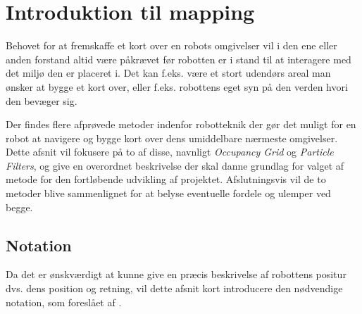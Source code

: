 \section{Introduktion til mapping}
Behovet for at fremskaffe et kort over en robots omgivelser vil i den ene eller anden forstand altid være påkrævet før robotten er i stand til at interagere med det miljø den er placeret i.
Det kan f.eks. være et stort udendørs areal man ønsker at bygge et kort over, eller f.eks. robottens eget syn på den verden hvori den bevæger sig.

Der findes flere afprøvede metoder indenfor robotteknik der gør det muligt for en robot at navigere og bygge kort over dens umiddelbare nærmeste omgivelser.
Dette afsnit vil fokusere på to af disse, navnligt \textit{Occupancy Grid} og \textit{Particle Filters}, og give en overordnet beskrivelse der skal danne grundlag for valget af metode for den fortløbende udvikling af projektet.
Afslutningsvis vil de to metoder blive sammenlignet for at belyse eventuelle fordele og ulemper ved begge.

\subsection{Notation}
Da det er ønskværdigt at kunne give en præcis beskrivelse af robottens positur dvs. dens position og retning, vil dette afsnit kort introducere den nødvendige notation, som foreslået af \citet[s.~16-21]{probabilisticRobotics}.

